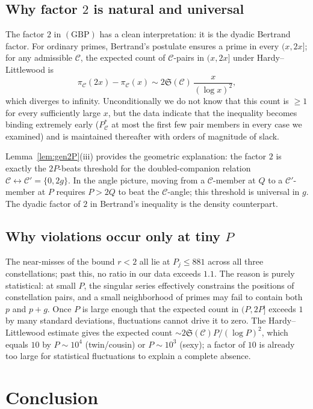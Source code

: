 \documentclass[11pt]{article}
\begin{document}
\subsection{Why factor $2$ is natural and universal}

The factor $2$ in $(\mathrm{GBP})$ has a clean interpretation: it
is the dyadic Bertrand factor. For ordinary primes, Bertrand's
postulate ensures a prime in every $(x,2x]$; for any admissible
$\mathcal{C}$, the expected count of $\mathcal{C}$-pairs in $(x,2x]$
under Hardy--Littlewood is
\[
\pi_\mathcal{C}(2x)-\pi_\mathcal{C}(x)
\sim 2\mathfrak{S}(\mathcal{C})\,\frac{x}{(\log x)^2},
\]
which diverges to infinity. Unconditionally we do not know that this
count is $\ge 1$ for every sufficiently large $x$, but the data
indicate that the inequality becomes binding extremely early
($P^{*}_\mathcal{C}$ at most the first few pair members in every
case we examined) and is maintained thereafter with orders of
magnitude of slack.

Lemma~\ref{lem:gen2P}(iii) provides the geometric explanation: the
factor $2$ is exactly the $2P$-beats threshold for the
doubled-companion relation
$\mathcal{C}\leftrightarrow\mathcal{C}'=\{0,2g\}$. In the angle
picture, moving from a $\mathcal{C}$-member at $Q$ to a
$\mathcal{C}'$-member at $P$ requires $P>2Q$ to beat the
$\mathcal{C}$-angle; this threshold is universal in $g$. The dyadic
factor of $2$ in Bertrand's inequality is the density counterpart.

\subsection{Why violations occur only at tiny $P$}

The near-misses of the bound $r<2$ all lie at
$P_j\le 881$ across all three constellations; past this, no ratio in
our data exceeds $1.1$. The reason is purely statistical: at small
$P$, the singular series effectively constrains the positions of
constellation pairs, and a small neighborhood of primes may fail to
contain both $p$ and $p+g$. Once $P$ is large enough that the
expected count in $(P,2P]$ exceeds $1$ by many standard deviations,
fluctuations cannot drive it to zero. The Hardy--Littlewood estimate
gives the expected count
$\sim 2\mathfrak{S}(\mathcal{C})P/(\log P)^2$, which equals $10$ by
$P\sim 10^4$ (twin/cousin) or $P\sim 10^3$ (sexy); a factor of $10$
is already too large for statistical fluctuations to explain a
complete absence.

\section{Conclusion}
\end{document}
